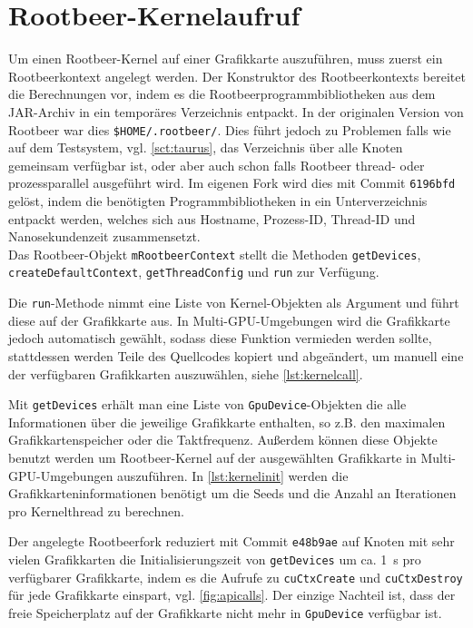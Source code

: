 \section{Rootbeer-Kernelaufruf}

Um einen Rootbeer-Kernel auf einer Grafikkarte auszuführen, muss zuerst ein Rootbeerkontext angelegt werden.
Der Konstruktor des Rootbeerkontexts bereitet die Berechnungen vor, indem es die Rootbeerprogrammbibliotheken aus dem JAR-Archiv in ein temporäres Verzeichnis entpackt.
In der originalen Version von Rootbeer war dies \lstinline!$HOME/.rootbeer/!.
Dies führt jedoch zu Problemen falls wie auf dem Testsystem, vgl. \autoref{sct:taurus}, das Verzeichnis über alle Knoten gemeinsam verfügbar ist, oder aber auch schon falls Rootbeer thread- oder prozessparallel ausgeführt wird.
Im eigenen Fork \cite{ownrootbeerfork} wird dies mit Commit \lstinline!6196bfd! gelöst, indem die benötigten Programmbibliotheken in ein Unterverzeichnis entpackt werden, welches sich aus Hostname, Prozess-ID, Thread-ID und Nanosekundenzeit zusammensetzt.\\

Das Rootbeer-Objekt \lstinline!mRootbeerContext! stellt die Methoden \lstinline!getDevices!, \lstinline!createDefaultContext!, \lstinline!getThreadConfig! und \lstinline!run! zur Verfügung.

Die \lstinline!run!-Methode nimmt eine Liste von Kernel-Objekten als Argument und führt diese auf der Grafikkarte aus. In Multi-GPU-Umgebungen wird die Grafikkarte jedoch automatisch gewählt, sodass diese Funktion vermieden werden sollte, stattdessen werden Teile des Quellcodes kopiert und abgeändert, um manuell eine der verfügbaren Grafikkarten auszuwählen, siehe \autoref{lst:kernelcall}.

Mit \lstinline!getDevices! erhält man eine Liste von \lstinline!GpuDevice!-Objekten die alle Informationen über die jeweilige Grafikkarte enthalten, so z.B. den maximalen Grafikkartenspeicher oder die Taktfrequenz.
Außerdem können diese Objekte benutzt werden um Rootbeer-Kernel auf der ausgewählten Grafikkarte in Multi-GPU-Umgebungen auszuführen. In \autoref{lst:kernelinit} werden die Grafikkarteninformationen benötigt um die Seeds und die Anzahl an Iterationen pro Kernelthread zu berechnen.

\label{pg:cuCtxCreate}
Der angelegte Rootbeerfork \cite{ownrootbeerfork} reduziert mit Commit \lstinline!e48b9ae! auf Knoten mit sehr vielen Grafikkarten die Initialisierungszeit von \lstinline!getDevices! um ca. \SI{1}{\second} pro verfügbarer Grafikkarte, indem es die Aufrufe zu \lstinline!cuCtxCreate! und \lstinline!cuCtxDestroy! für jede Grafikkarte einspart, vgl. \autoref{fig:apicalls}.
Der einzige Nachteil ist, dass der freie Speicherplatz auf der Grafikkarte nicht mehr in \lstinline!GpuDevice! verfügbar ist.

